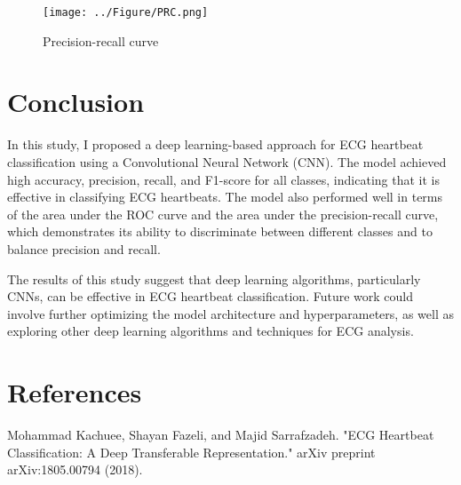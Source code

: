 \documentclass[14pt]{extreport}
\begin{document}
\begin{figure}[H]
    \centering
    \captionsetup{justification=centering,margin=2cm}
    \texttt{[image: ../Figure/PRC.png]}
    \caption{Precision-recall curve}
    \label{Precision-recall curve}
\end{figure}



\chapter{Conclusion}

In this study, I proposed a deep learning-based approach for ECG heartbeat classification using a Convolutional Neural Network (CNN). The model achieved high accuracy, precision, recall, and F1-score for all classes, indicating that it is effective in classifying ECG heartbeats. The model also performed well in terms of the area under the ROC curve and the area under the precision-recall curve, which demonstrates its ability to discriminate between different classes and to balance precision and recall.

The results of this study suggest that deep learning algorithms, particularly CNNs, can be effective in ECG heartbeat classification. Future work could involve further optimizing the model architecture and hyperparameters, as well as exploring other deep learning algorithms and techniques for ECG analysis.

\clearpage

\chapter{References}
\begingroup
\renewcommand{\chapter}[2]{}
\begin{thebibliography}{}
    Mohammad Kachuee, Shayan Fazeli, and Majid Sarrafzadeh. "ECG Heartbeat Classification: A Deep Transferable Representation." arXiv preprint arXiv:1805.00794 (2018).

\end{thebibliography}
\endgroup
\end{document}
